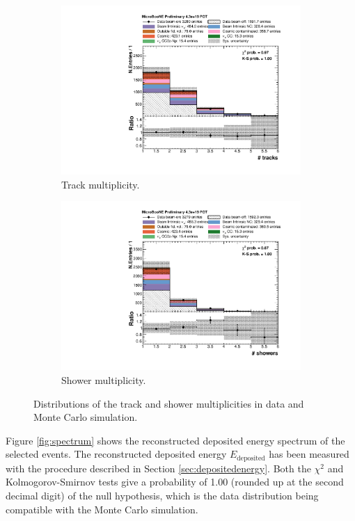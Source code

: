 \begin{figure}[htbp]
\centering
  \begin{subfigure}{0.49\textwidth}
    \includegraphics[width=\linewidth]{figures/n_tracks.pdf}
    \caption{Track multiplicity.} 
  \end{subfigure}\hfill
    \begin{subfigure}{0.49\textwidth}
    \includegraphics[width=\linewidth]{figures/n_showers.pdf}
    \caption{Shower multiplicity.} 
  \end{subfigure}
  \caption{Distributions of the track and shower multiplicities in data and Monte Carlo simulation.}\label{fig:multiplicity}
\end{figure}

Figure \ref{fig:spectrum} shows the reconstructed deposited energy spectrum of the selected events. The reconstructed deposited energy $E_{\mathrm{deposited}}$ has been measured with the procedure described in Section \ref{sec:depositedenergy}. Both the $\chi^2$ and Kolmogorov-Smirnov tests give a probability of 1.00 (rounded up at the second decimal digit) of the null hypothesis, which is the data distribution being compatible with the Monte Carlo simulation.

